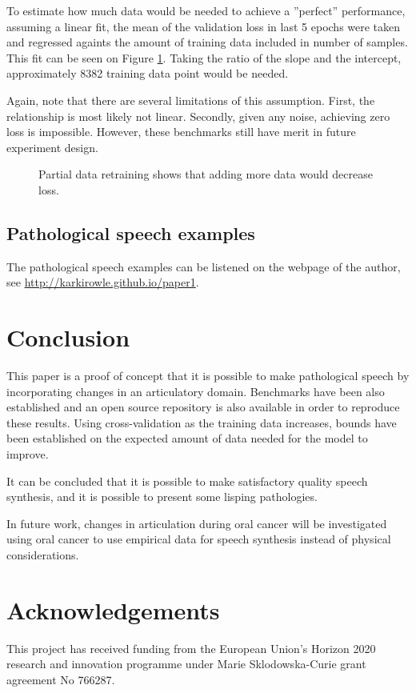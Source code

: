 \documentclass[a4paper]{article}
\begin{document}
To estimate how much data would be needed to achieve a ''perfect'' performance,
assuming a linear fit, the mean of the validation loss in last 5 epochs
were taken and regressed againts the amount of training data included in
number of samples. This fit can be seen on Figure \ref{retraining_linear}.
Taking the ratio of the slope and the intercept, approximately 8382
training data point would be needed.

Again, note that there are several limitations of this assumption. First, the
relationship is most likely not linear. Secondly, given any noise, achieving
zero loss is impossible. However, these benchmarks still have merit in
future experiment design.

\begin{figure}[t]
  \begin{center}
    \scalebox{0.50}{}
    \caption{Partial data retraining shows that adding more data would
      decrease loss. }
    \label{retraining_linear}
\end{center}
\end{figure}


\subsection{Pathological speech examples}

The pathological speech examples can be listened on the webpage of the
author, see \url{http://karkirowle.github.io/paper1}. 

\section{Conclusion}

This paper is a proof of concept that it is possible to make pathological
speech by incorporating changes in an articulatory domain. Benchmarks
have been also established and an open source repository is also available
in order to reproduce these results. Using cross-validation as the
training data increases, bounds have been established on the expected
amount of data needed for the model to improve.

It can be concluded that it is possible to make satisfactory quality
speech synthesis, and it is possible to present some lisping pathologies.

In future work, changes in articulation during oral cancer will be
investigated using oral cancer to use empirical data for speech synthesis
instead of physical considerations.

\section{Acknowledgements}
This project has received funding from the European Union's Horizon
2020 research and innovation programme under Marie Sklodowska-Curie
grant agreement No 766287.






\end{document}
